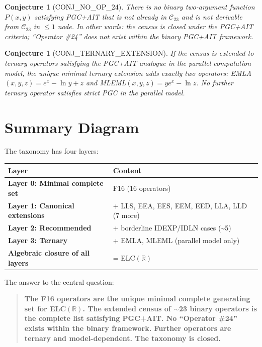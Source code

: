 \documentclass[11pt]{article}
\newtheorem{conjecture}[theorem]{Conjecture}
\begin{document}
\begin{conjecture}[CONJ\_NO\_OP\_24]
There is no binary two-argument function $P(x,y)$ satisfying PGC+AIT
that is not already in $\mathcal{C}_{23}$ and is not derivable from
$\mathcal{C}_{23}$ in $\leq 1$ node.
In other words: the census is closed under the PGC+AIT criteria;
``Operator \#24'' does not exist within the binary PGC+AIT framework.
\end{conjecture}

\begin{conjecture}[CONJ\_TERNARY\_EXTENSION]
If the census is extended to ternary operators satisfying the PGC+AIT analogue
in the parallel computation model, the unique minimal ternary extension adds
exactly two operators: EMLA$(x,y,z) = e^x - \ln y + z$ and
MLEML$(x,y,z) = y e^x - \ln z$.
No further ternary operator satisfies strict PGC in the parallel model.
\end{conjecture}

\section{Summary Diagram}
\label{sec:diagram}

The taxonomy has four layers:

\begin{center}
\begin{tabular}{ll}
\toprule
Layer & Content \\
\midrule
\textbf{Layer 0: Minimal complete set} & F16 (16 operators) \\
\textbf{Layer 1: Canonical extensions} & + LLS, EEA, EES, EEM, EED, LLA, LLD (7 more) \\
\textbf{Layer 2: Recommended} & + borderline IDEXP/IDLN cases (\textasciitilde5) \\
\textbf{Layer 3: Ternary} & + EMLA, MLEML (parallel model only) \\
\midrule
\textbf{Algebraic closure of all layers} & = ELC$(\mathbb{R})$ \\
\bottomrule
\end{tabular}
\end{center}

\noindent The answer to the central question:

\begin{quote}
\textbf{The F16 operators are the unique minimal complete generating set for
ELC$(\mathbb{R})$.
The extended census of $\sim$23 binary operators is the complete list satisfying
PGC+AIT.
No ``Operator \#24'' exists within the binary framework.
Further operators are ternary and model-dependent.
The taxonomy is closed.}
\end{quote}
\end{document}
